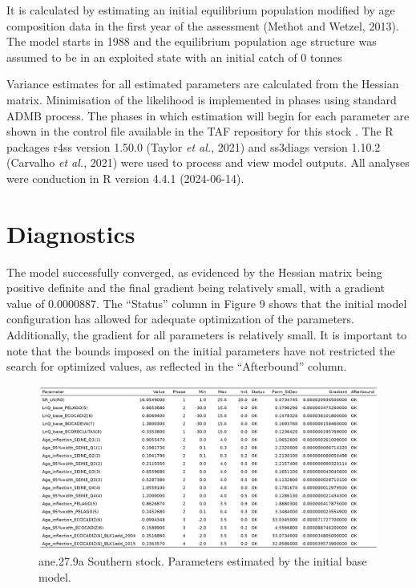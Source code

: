 \documentclass[
]{article}
\begin{document}
It is calculated by estimating an initial equilibrium population
modified by age composition data in the first year of the assessment
(Methot and Wetzel, 2013). The model starts in 1988 and the equilibrium
population age structure was assumed to be in an exploited state with an
initial catch of 0 tonnes

Variance estimates for all estimated parameters are calculated from the
Hessian matrix. Minimisation of the likelihood is implemented in phases
using standard ADMB process. The phases in which estimation will begin
for each parameter are shown in the control file available in the TAF
repository for this stock . The R packages r4ss version 1.50.0 (Taylor
\emph{et al.}, 2021) and ss3diags version 1.10.2 (Carvalho \emph{et
al.}, 2021) were used to process and view model outputs. All analyses
were conduction in R version 4.4.1 (2024-06-14).

\hypertarget{diagnostics}{%
\section{Diagnostics}\label{diagnostics}}

The model successfully converged, as evidenced by the Hessian matrix
being positive definite and the final gradient being relatively small,
with a gradient value of 0.0000887. The ``Status'' column in Figure 9
shows that the initial model configuration has allowed for adequate
optimization of the parameters. Additionally, the gradient for all
parameters is relatively small. It is important to note that the bounds
imposed on the initial parameters have not restricted the search for
optimized values, as reflected in the ``Afterbound'' column.

\begin{figure}[H]

{\centering \includegraphics[width=0.95\linewidth]{report/run/S1.0_4FLEETS_SelECO_RecIndex_Mnewfix/tb_params_est} 

}

\caption{ane.27.9a Southern stock. Parameters estimated by the initial base model.}\label{fig:unnamed-chunk-13}
\end{figure}
\end{document}
